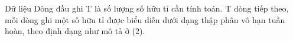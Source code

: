 Dữ liệu
Dòng đầu ghi T là số lượng số hữu tỉ cần tính toán. T dòng tiếp theo, mỗi dòng ghi một số hữu tỉ được biểu diễn dưới dạng thập phân vô hạn tuần hoàn, theo định dạng như mô tả ở (2).